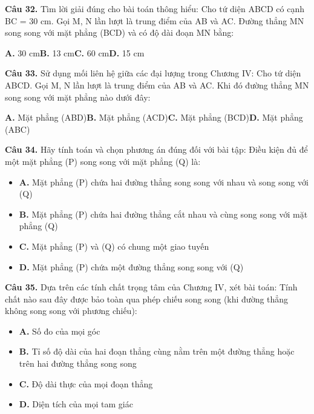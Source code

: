 \documentclass[11pt,a4paper]{article}
\begin{document}
\textbf{\color{primary} Câu 32.} Tìm lời giải đúng cho bài toán thông hiểu: Cho tứ diện ABCD có cạnh BC = 30 cm. Gọi M, N lần lượt là trung điểm của AB và AC. Đường thẳng MN song song với mặt phẳng (BCD) và có độ dài đoạn MN bằng:\par
\hspace*{1.5em}\textbf{A.} 30 cm\quad\quad \textbf{B.} 13 cm\quad\quad \textbf{C.} 60 cm\quad\quad \textbf{D.} 15 cm\par\vspace{2pt}
\textbf{\color{primary} Câu 33.} Sử dụng mối liên hệ giữa các đại lượng trong Chương IV: Cho tứ diện ABCD. Gọi M, N lần lượt là trung điểm của AB và AC. Khi đó đường thẳng MN song song với mặt phẳng nào dưới đây:\par
\hspace*{1.5em}\textbf{A.} Mặt phẳng (ABD)\quad\quad \textbf{B.} Mặt phẳng (ACD)\quad\quad \textbf{C.} Mặt phẳng (BCD)\quad\quad \textbf{D.} Mặt phẳng (ABC)\par\vspace{2pt}
\textbf{\color{primary} Câu 34.} Hãy tính toán và chọn phương án đúng đối với bài tập: Điều kiện đủ để một mặt phẳng (P) song song với mặt phẳng (Q) là:\par
\begin{itemize}\setlength{\itemsep}{1pt}\setlength{\parskip}{0pt}
  \item[] \textbf{A.} Mặt phẳng (P) chứa hai đường thẳng song song với nhau và song song với (Q)
  \item[] \textbf{B.} Mặt phẳng (P) chứa hai đường thẳng cắt nhau và cùng song song với mặt phẳng (Q)
  \item[] \textbf{C.} Mặt phẳng (P) và (Q) có chung một giao tuyến
  \item[] \textbf{D.} Mặt phẳng (P) chứa một đường thẳng song song với (Q)
\end{itemize}\vspace{2pt}
\textbf{\color{primary} Câu 35.} Dựa trên các tính chất trọng tâm của Chương IV, xét bài toán: Tính chất nào sau đây được bảo toàn qua phép chiếu song song (khi đường thẳng không song song với phương chiếu):\par
\begin{itemize}\setlength{\itemsep}{1pt}\setlength{\parskip}{0pt}
  \item[] \textbf{A.} Số đo của mọi góc
  \item[] \textbf{B.} Tỉ số độ dài của hai đoạn thẳng cùng nằm trên một đường thẳng hoặc trên hai đường thẳng song song
  \item[] \textbf{C.} Độ dài thực của mọi đoạn thẳng
  \item[] \textbf{D.} Diện tích của mọi tam giác
\end{itemize}\vspace{2pt}
\end{document}
